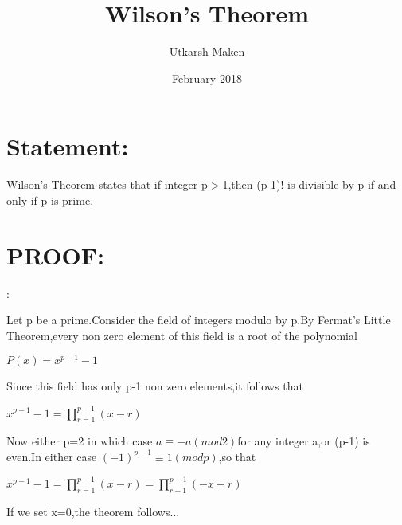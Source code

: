 \documentclass{article}
\title{Wilson's Theorem}
\author{Utkarsh Maken }
\date{February 2018}
\begin{document}
\maketitle

\section{Statement:}
Wilson's Theorem states that if integer p$>$1,then (p-1)! is divisible by p if and only if p is prime.

\section{PROOF:}:

Let p be a prime.Consider the field of integers modulo by p.By Fermat's Little Theorem,every non zero element of this field is a root of the polynomial
\begin{center}
    $P(x)=x^{p-1}-1$
\end{center}


Since this field has only p-1 non zero elements,it follows that
\begin{center}
    $x^{p-1}-1=\prod_{r=1}^{p-1}(x-r)$
\end{center}

Now either p=2 in which case $ a\equiv -a(mod 2)$for any integer a,or (p-1) is even.In either case $(-1)^{p-1}\equiv 1(mod p)$,so that


\begin{center}
    $x^{p-1}-1=\prod_{r=1}^{p-1}(x-r)=\prod_{r-1}^{p-1}(-x+r)$
\end{center}
If we set x=0,the theorem follows...
 
\end{document}
